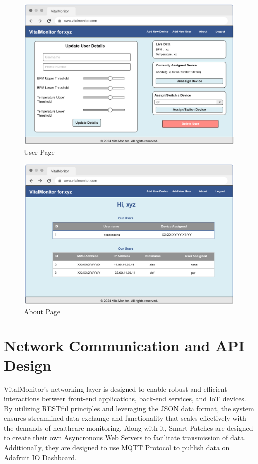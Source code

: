 \begin{figure}[!h]
    \centering
    \includegraphics[width=0.9\linewidth]{images/update user details.png}
    \caption{User Page}
    \label{fig:wf-5}
\end{figure}
\begin{figure}[!h]
    \centering
    \includegraphics[width=0.9\linewidth]{images/VitalMonitor.png}
    \caption{About Page}
    \label{fig:wf6}
\end{figure}


\section{Network Communication and API Design}
VitalMonitor's networking layer is designed to enable robust and efficient interactions between front-end applications, back-end services, and IoT devices. By utilizing RESTful principles and leveraging the JSON data format, the system ensures streamlined data exchange and functionality that scales effectively with the demands of healthcare monitoring. Along with it, Smart Patches are designed to create their own Asyncronous Web Servers to facilitate transmission of data. Additionally, they are designed to use MQTT Protocol to publish data on Adafruit IO Dashboard.\\


